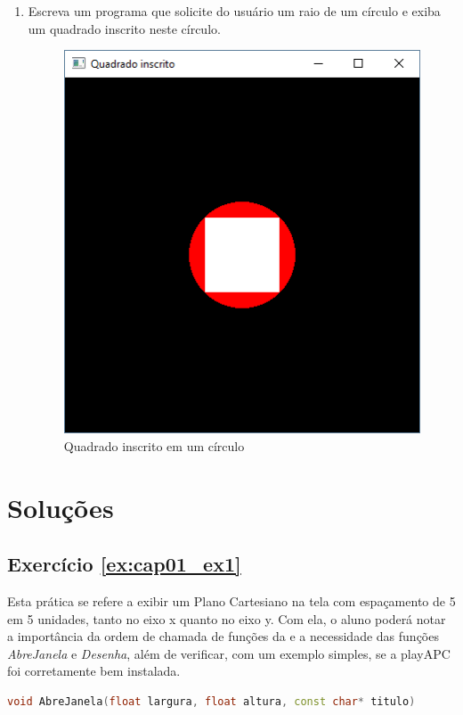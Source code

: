 \begin{enumerate}
  \item
  Escreva um programa que solicite do usuário um raio de um círculo e exiba um quadrado inscrito neste círculo.
  \label{ex:cap01_ex8}

  \begin{figure}[H]
    \centerline{\includegraphics[width=.5\textwidth]{img/cap1_ex21}}
    \caption{Quadrado inscrito em um círculo}
    \label{fig:cap01_ex8}
  \end{figure}

\end{enumerate}


\section*{Soluções}

\subsection*{Exercício \ref{ex:cap01_ex1}}

Esta prática se refere a exibir um Plano Cartesiano na tela com espaçamento de 5 em 5 unidades, tanto no eixo x quanto no eixo y. Com ela, o aluno poderá notar a importância da ordem de chamada de funções da \playAPC{} e a necessidade das funções \emph{AbreJanela} e \emph{Desenha}, além de verificar, com um exemplo simples, se a playAPC{} foi corretamente bem instalada.



\begin{lstlisting}[label={func:AbreJanela},language=C++]
void AbreJanela(float largura, float altura, const char* titulo)
\end{lstlisting}

